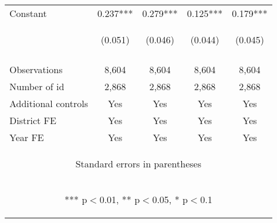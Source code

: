 \begin{center}
\begin{tabular}{lcccc}
Constant & 0.237*** & 0.279*** & 0.125*** & 0.179*** \\
 & \begin{footnotesize}(0.051)\end{footnotesize} & \begin{footnotesize}(0.046)\end{footnotesize} & \begin{footnotesize}(0.044)\end{footnotesize} & \begin{footnotesize}(0.045)\end{footnotesize} \\
\vspace{4pt} & \begin{footnotesize}\end{footnotesize} & \begin{footnotesize}\end{footnotesize} & \begin{footnotesize}\end{footnotesize} & \begin{footnotesize}\end{footnotesize} \\
Observations & 8,604 & 8,604 & 8,604 & 8,604 \\
Number of id & 2,868 & 2,868 & 2,868 & 2,868 \\
Additional controls & Yes & Yes & Yes & Yes \\
District FE & Yes & Yes & Yes & Yes \\
 Year FE & Yes & Yes & Yes & Yes \\ \hline
\multicolumn{5}{c}{\begin{footnotesize} Standard errors in parentheses\end{footnotesize}} \\
\multicolumn{5}{c}{\begin{footnotesize} *** p$<$0.01, ** p$<$0.05, * p$<$0.1\end{footnotesize}} \\
\end{tabular}
\end{center}
